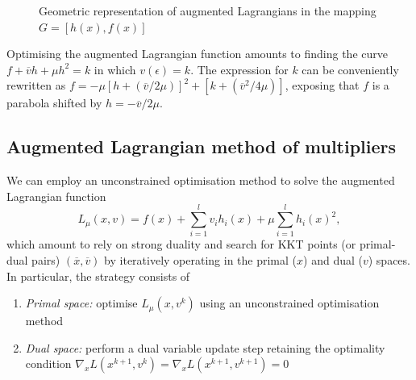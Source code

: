 \begin{figure}
	\caption{Geometric representation of augmented Lagrangians in the mapping $G = [h(x), f(x)]$} \label{fig:Fig2}
\end{figure}

Optimising the augmented Lagrangian function amounts to finding the curve $f + \overline{v}h + \mu h^2 = k$ in which $v(\epsilon) = k$. The expression for $k$ can be conveniently rewritten as $f = -\mu \left[ h + (\overline{v}/2\mu)\right]^2 + \left[k + (\overline{v}^2/4\mu)\right]$, exposing that $f$ is a parabola shifted by $h = -\overline{v}/2\mu$.


\subsection{Augmented Lagrangian method of multipliers}


We can employ an unconstrained optimisation method to solve the augmented Lagrangian function
$$ 
L_\mu(x,v) = f(x) + \sum_{i=1}^lv_ih_i(x) + \mu\sum_{i=1}^lh_i(x)^2,
$$
which amount to rely on strong duality and search for KKT points (or primal-dual pairs) $(\overline{x},\overline{v})$ by iteratively operating in the primal ($x$) and dual ($v$) spaces. In particular, the strategy consists of
\begin{enumerate}
\item \emph{Primal space:} optimise $L_\mu(x,v^k)$ using an unconstrained optimisation method
\item \emph{Dual space:} perform a dual variable update step retaining the optimality condition $\nabla_x L(x^{k+1},v^k) = \nabla_x L(x^{k+1},v^{k+1}) = 0$
\end{enumerate}

